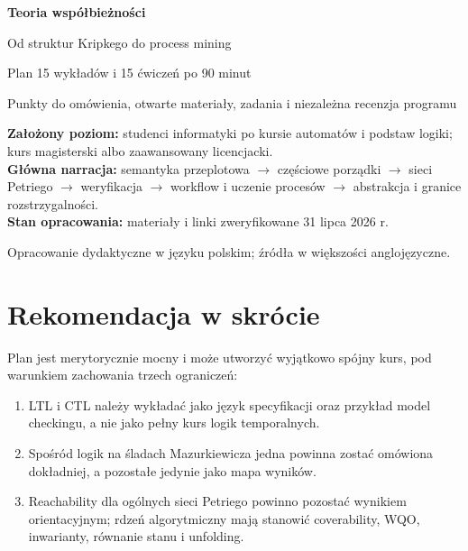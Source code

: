 \documentclass[11pt,a4paper]{article}
\newenvironment{summarybox}
  {\par\medskip\noindent\begin{center}\begin{minipage}{0.94\textwidth}\small}
  {\end{minipage}\end{center}\medskip}
\begin{document}
\begin{titlepage}
\centering
\vspace*{18mm}
{\sffamily\bfseries\color{navy}\fontsize{28}{34}\selectfont Teoria współbieżności}\par
\vspace{4mm}
{\sffamily\color{blue}\fontsize{18}{23}\selectfont Od struktur Kripkego do process mining}\par
\vspace{15mm}
{\Large Plan 15 wykładów i 15 ćwiczeń po 90 minut}\par
\vspace{4mm}
{\large Punkty do omówienia, otwarte materiały, zadania i niezależna recenzja programu}\par
\vfill
\begin{summarybox}
\textbf{Założony poziom:} studenci informatyki po kursie automatów i podstaw logiki; kurs magisterski albo zaawansowany licencjacki.\\
\textbf{Główna narracja:} semantyka przeplotowa $\to$ częściowe porządki $\to$ sieci Petriego $\to$ weryfikacja $\to$ workflow i uczenie procesów $\to$ abstrakcja i granice rozstrzygalności.\\
\textbf{Stan opracowania:} materiały i linki zweryfikowane 31 lipca 2026 r.
\end{summarybox}
\vfill
{\small Opracowanie dydaktyczne w języku polskim; źródła w większości anglojęzyczne.}
\end{titlepage}

\tableofcontents
\newpage

\section{Rekomendacja w skrócie}

\begin{summarybox}
Plan jest merytorycznie mocny i może utworzyć wyjątkowo spójny kurs, pod warunkiem zachowania trzech ograniczeń:
\begin{enumerate}
\item LTL i CTL należy wykładać jako język specyfikacji oraz przykład model checkingu, a nie jako pełny kurs logik temporalnych.
\item Spośród logik na śladach Mazurkiewicza jedna powinna zostać omówiona dokładniej, a pozostałe jedynie jako mapa wyników.
\item Reachability dla ogólnych sieci Petriego powinno pozostać wynikiem orientacyjnym; rdzeń algorytmiczny mają stanowić coverability, WQO, inwarianty, równanie stanu i unfolding.
\end{enumerate}
\end{summarybox}
\end{document}
